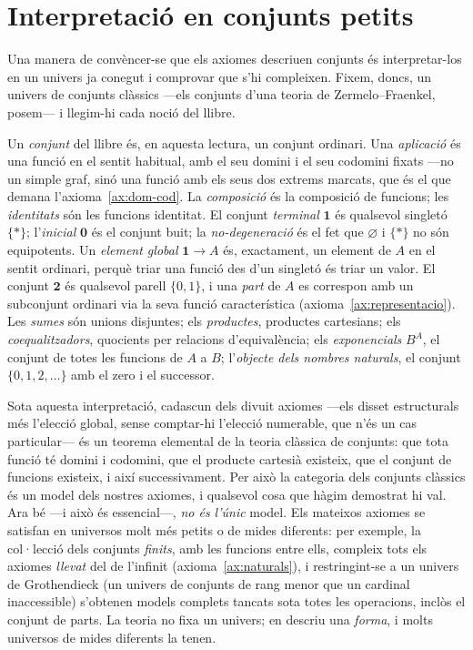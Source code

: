 \section{Interpretació en conjunts petits}\label{sec:conjunts-petits}

Una manera de convèncer-se que els axiomes descriuen conjunts és
interpretar-los en un univers ja conegut i comprovar que s'hi compleixen.
Fixem, doncs, un univers de conjunts clàssics ---els conjunts d'una teoria
de Zermelo--Fraenkel, posem--- i llegim-hi cada noció del llibre.

Un \emph{conjunt} del llibre és, en aquesta lectura, un conjunt ordinari.
Una \emph{aplicació} és una funció en el sentit habitual, amb el seu
domini i el seu codomini fixats ---no un simple graf, sinó una funció amb
els seus dos extrems marcats, que és el que demana l'axioma~\ref{ax:dom-cod}.
La \emph{composició} és la composició de funcions; les \emph{identitats}
són les funcions identitat. El conjunt \emph{terminal} \(\mathbf1\) és
qualsevol singletó \(\{\ast\}\); l'\emph{inicial} \(\mathbf0\) és el
conjunt buit; la \emph{no-degeneració} és el fet que \(\varnothing\) i
\(\{\ast\}\) no són equipotents. Un \emph{element global} \(\mathbf1\to A\)
és, exactament, un element de \(A\) en el sentit ordinari, perquè triar
una funció des d'un singletó és triar un valor. El conjunt \(\mathbf2\) és
qualsevol parell \(\{0,1\}\), i una \emph{part} de \(A\) es correspon amb
un subconjunt ordinari via la seva funció característica
(axioma~\ref{ax:representacio}). Les \emph{sumes} són unions disjuntes; els
\emph{productes}, productes cartesians; els \emph{coequalitzadors},
quocients per relacions d'equivalència; els \emph{exponencials}
\(B^{A}\), el conjunt de totes les funcions de \(A\) a \(B\); l'\emph{objecte
dels nombres naturals}, el conjunt \(\{0,1,2,\dots\}\) amb el zero i el
successor.

\begin{observacio}\label{obs:interpretacio-fidel}
Sota aquesta interpretació, cadascun dels divuit axiomes ---els disset
estructurals més l'elecció global, sense comptar-hi l'elecció numerable,
que n'és un cas particular--- és un teorema
elemental de la teoria clàssica de conjunts: que tota funció té domini i
codomini, que el producte cartesià existeix, que el conjunt de funcions
existeix, i així successivament. Per això la categoria dels conjunts
clàssics és un model dels nostres axiomes, i qualsevol cosa que hàgim
demostrat hi val. Ara bé ---i això és essencial---, \emph{no és l'únic}
model. Els mateixos axiomes se satisfan en universos molt més petits o de
mides diferents: per exemple, la col·lecció dels conjunts \emph{finits}, amb
les funcions entre ells, compleix tots els axiomes \emph{llevat} del de
l'infinit (axioma~\ref{ax:naturals}), i restringint-se a un univers de
Grothendieck (un univers de conjunts de rang menor que un cardinal
inaccessible) s'obtenen models complets tancats sota totes les operacions,
inclòs el conjunt de parts. La teoria no fixa un univers; en descriu una
\emph{forma}, i molts universos de mides diferents la tenen.
\end{observacio}

